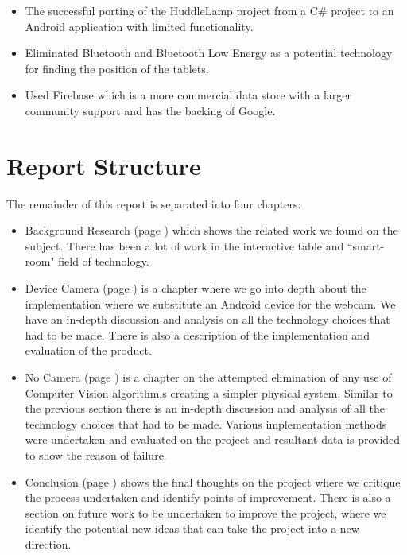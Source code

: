 \begin{itemize}
\item The successful porting of the HuddleLamp project from a C\# project to an Android application with limited functionality.
\item Eliminated Bluetooth and Bluetooth Low Energy as a potential technology for finding the position of the tablets.
\item Used Firebase which is a more commercial data store with a larger community support and has the backing of Google.
\end{itemize}

\section{Report Structure}

The remainder of this report is separated into four chapters:
\begin{itemize}
\item Background Research (page \pageref{ch:background}) which shows the related work we found on the subject. There has been a lot of work in the interactive table and ``smart-room" field of technology.
\item Device Camera (page \pageref{ch:devcamera}) is a chapter where we go into depth about the implementation where we substitute an Android device for the webcam. We have an in-depth discussion and analysis on all the technology choices that had to be made. There is also a description of the implementation and evaluation of the product.
\item No Camera (page \pageref{ch:no_camera}) is a chapter on the attempted elimination of any use of Computer Vision algorithm,s creating a simpler physical system. Similar to the previous section there is an in-depth discussion and analysis of all the technology choices that had to be made. Various implementation methods were undertaken and evaluated on the project and resultant data is provided to show the reason of failure.
\item Conclusion (page \pageref{ch:conclusions}) shows the final thoughts on the project where we critique the process undertaken and identify points of improvement. There is also a section on future work to be undertaken to improve the project, where we identify the potential new ideas that can take the project into a new direction. 
\end{itemize}

